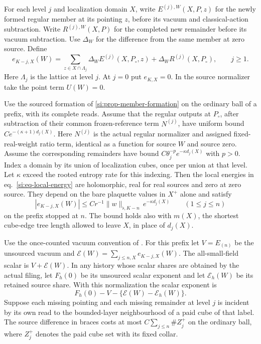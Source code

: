 \documentclass[11pt,letterpaper,reqno]{amsart}
\makeatletter
\numberwithin{equation}{section}
\renewcommand{\eqref}[1]{\textup{eq.~\ref{#1}}}
\theoremstyle{definition}
\newcommand{\ms@minorstart}{%
  \pushQED{\qed}\renewcommand{\qedsymbol}{$\blacksquare$}}
\newenvironment{proposition}[1][]{\ms@minorstart\ms@proposition[#1]}
  {\popQED\endms@proposition}
\theoremstyle{remark}
\makeatother
\begin{document}
For each level $j$ and localization domain $X$, write $E^{(j),W}(X,P,z)$
for the newly formed regular member at its pointing $z$, before
its vacuum and classical-action subtraction. Write $R^{(j),W}(X,P)$
for the completed new remainder before its vacuum subtraction.
Use $\Delta_W$ for the difference
from the same member at zero source. Define
\begin{equation}\label{si:eq-local-energy}
 e_{K-j,X}(W)=\sum_{z\in X\cap\Lambda_j}
                \Delta_W E^{(j)}(X,P_\circ,z)
                      +\Delta_W R^{(j)}(X,P_\circ),\qquad j\ge1.
\end{equation}
Here $\Lambda_j$ is the lattice at level $j$. At $j=0$ put $e_{K,X}=0$.
In the source normalizer take the point term $U(W)=0$.

\begin{samepage}
\begin{proposition}[Locality, entropy and the vacuum difference]
\label{si:prop-local-energies}
Use the sourced formation of \cref{si:prop-member-formation}
on the ordinary ball of a prefix, with its complete reads. Assume
that the regular outputs at $P_\circ$, after subtraction of
their common frozen-reference term $N^{(j)}$, have uniform bound
$C e^{-(\kappa+1)d_j(X)}$. Here $N^{(j)}$ is the actual regular
normalizer and assigned fixed-real-weight ratio term, identical
as a function for source $W$ and source zero. Assume the corresponding
remainders have bound $C\theta_j^{-p}e^{-\kappa d_j(X)}$ with $p>0$.
Index a domain by its union of localization cubes, once per union
at that level. Let $\kappa$ exceed the rooted entropy rate for
this indexing. Then the local energies in \eqref{si:eq-local-energy}
are holomorphic, real for real sources and zero at zero source.
They depend on the bare plaquette values in $X^+$ alone and satisfy
\begin{equation}\label{si:eq-energy-decay}
 |e_{K-j,X}(W)|\le C r^{-1}\|w\|_{\flat,K-n}\,e^{-\kappa d_j(X)}
                      \qquad(1\le j\le n)
\end{equation}
on the prefix stopped at $n$. The bound holds also with $m(X)$,
the shortest cube-edge tree length allowed to leave $X$, in
place of $d_j(X)$.

Use the once-counted vacuum convention of \cite{RT}. For this
prefix let $V=E_{(n)}$ be the unsourced vacuum and
$\mathcal E(W)=\sum_{j\le n,X}e_{K-j,X}(W)$. The all-small-field
scalar is $V+\mathcal E(W)$. In any history whose scalar shares are
obtained by the actual filing, let $F_h(0)$ be its unsourced
scalar exponent and let $\mathcal E_h(W)$ be its retained source
share. With this normalization the scalar exponent is
\begin{equation}\label{si:eq-vacuum-share}
  F_h(0)-V-\{\mathcal E(W)-\mathcal E_h(W)\}.
\end{equation}
Suppose each missing pointing and each missing remainder at
level $j$ is incident by its own read to the bounded-layer
neighbourhood of a paid cube of that label. The source difference
in braces costs at most $C\sum_{j\le n}\# Z_j^+$ on the ordinary
ball, where $Z_j^+$ denotes the paid cube set with its fixed collar.
\end{proposition}
\end{samepage}
\end{document}
